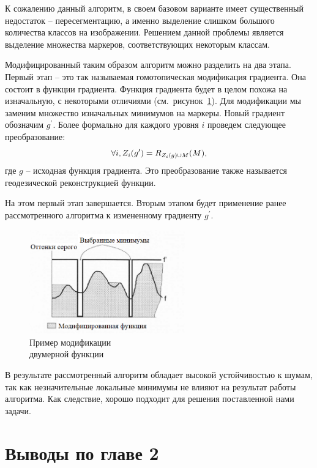 \documentclass[14pt, a4paper]{extreport}
\begin{document}
	К сожалению данный алгоритм, в своем базовом варианте имеет существенный недостаток -- пересегментацию, а именно выделение слишком большого количества классов на изображении. Решением данной проблемы является выделение множества маркеров, соответствующих некоторым классам.
	
	Модифицированный таким образом алгоритм можно разделить на два этапа. Первый этап -- это так называемая гомотопическая модификация градиента. Она состоит в функции градиента. Функция градиента будет в целом похожа на изначальную, с некоторыми отличиями (см.~рисунок~\ref{fig:Watershed_markers_modification}). Для модификации мы заменим множество изначальных минимумов на маркеры. Новый градиент обозначим $g^\prime$. Более формально для каждого уровня $i$ проведем следующее преобразование:\vspace*{-0.3cm}
	\begin{equation*}
		\forall i, Z_i(g^\prime)=R_{Z_i(g)\cup M}(M),
		\vspace*{-0.3cm}
		\label{IZ_X(Y)}
	\end{equation*}
	где $g$ -- исходная функция градиента. Это преобразование также называется геодезической реконструкцией функции.
	
	На этом первый этап завершается. Вторым этапом будет применение ранее рассмотренного алгоритма к измененному градиенту $g^\prime$.
	\begin{figure}[h!]
		\centering
		\includegraphics[width = 0.6\textwidth]{image/chapter_2/Watershed_markers_modification}	
		\caption{Пример модификации \\двумерной функции}
		\label{fig:Watershed_markers_modification}
	\end{figure}
	
	В результате рассмотренный алгоритм обладает высокой устойчивостью к шумам, так как незначительные локальные минимумы не влияют на результат работы алгоритма. Как следствие, хорошо подходит для решения поставленной нами задачи.
	
\section[Выводы по главе 2]{Выводы по главе 2}
\end{document}

